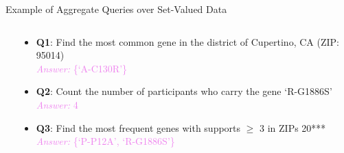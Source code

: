 \documentclass[xcolor={dvipsnames},aspectratio=169,10pt]{beamer}
\begin{document}
\begin{frame}[fragile]{Example of Aggregate Queries over Set-Valued Data}
  \begin{columns}[onlytextwidth]
    \begin{column}{.5\linewidth}
      \begin{table}
        \caption{Set-Valued Genome Dataset~\cite{pgp}}
      \end{table}
    \end{column}%
    \begin{column}{.5\linewidth}
      \begin{itemize}[<+(1)->]%
        \item \textbf{Q1}: Find the most common gene in the district of Cupertino, CA (ZIP\@: 95014) \\
          \textcolor{Violet}{\emph{Answer:} \{`A-C130R'\}}
        \item \textbf{Q2}: Count the number of participants who carry the gene `R-G1886S' \\
          \textcolor{Violet}{\emph{Answer:} 4}
        \item \textbf{Q3}: Find the most frequent genes with supports $\ge$ 3 in ZIPs 20*** \\
          \textcolor{Violet}{\emph{Answer:} \{`P-P12A', `R-G1886S'\}}
      \end{itemize}
    \end{column}
  \end{columns}
\end{frame}
\end{document}

